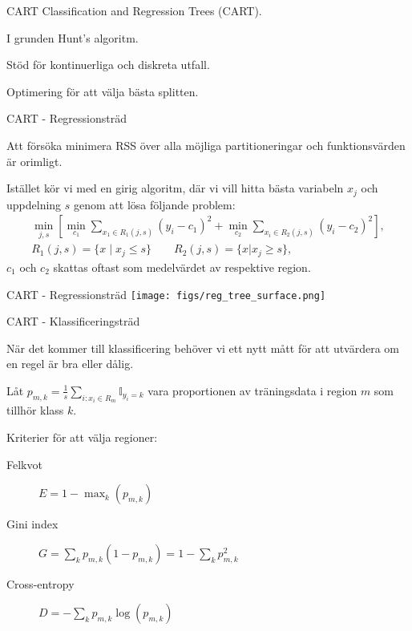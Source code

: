 \documentclass[10pt,english]{beamer}
\begin{document}
\begin{frame}{CART}
    Classification and Regression Trees (CART).

    I grunden Hunt's algoritm.

    Stöd för kontinuerliga och diskreta utfall.

    Optimering för att välja bästa splitten.
\end{frame}

\begin{frame}{CART - Regressionsträd}
    
    Att försöka minimera RSS över alla möjliga partitioneringar och funktionsvärden är orimligt.

    Istället kör vi med en girig algoritm, där vi vill hitta bästa variabeln $x_j$ och uppdelning $s$ genom att lösa följande problem:
    \begin{align*}
        \min_{j,s} \left[ \min_{c_1} \sum_{x_1 \in R_1(j,s)} (y_i - c_1)^2 + \min_{c_2} \sum_{x_i \in R_2(j,s)} (y_i - c_2)^2 \right], \\
        R_1(j,s) = \{x \mid x_j \leq s\} \qquad R_2(j,s) = \{x | x_j \geq s\},
    \end{align*}
    $c_1$ och $c_2$ skattas oftast som medelvärdet av respektive region.
\end{frame}

\begin{frame}{CART - Regressionsträd}
    \texttt{[image: figs/reg\_tree\_surface.png]}
\end{frame}

\begin{frame}{CART - Klassificeringsträd}
    
    När det kommer till klassificering behöver vi ett nytt mått för att utvärdera om en regel är bra eller dålig.

    Låt $p_{m,k} = \frac{1}{s} \sum_{i : x_i \in R_m} \mathbb{I}_{y_i = k}$ vara proportionen av träningsdata i region $m$ som tillhör klass $k$.

    Kriterier för att välja regioner:
    \begin{description}
        \item[Felkvot] $E = 1 - \max_{k} (p_{m,k})$
        \item[Gini index] $G = \sum_{k} p_{m,k} ( 1 - p_{m,k}) = 1 - \sum_{k} p_{m,k}^2$
        \item[Cross-entropy] $D = - \sum_{k} p_{m,k} \log(p_{m,k})$   
    \end{description}

\end{frame}
\end{document}
